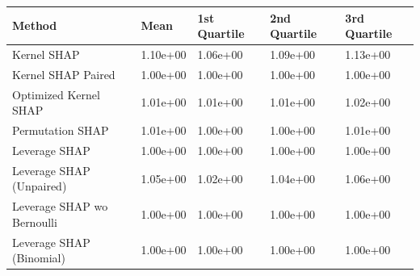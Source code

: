 \begin{tabular}{lllll}
  \toprule
  \textbf{Method} & \textbf{Mean} & \textbf{1st Quartile} & \textbf{2nd Quartile} & \textbf{3rd Quartile} \\ \midrule
Kernel SHAP & 1.10e+00 & 1.06e+00 & 1.09e+00 & 1.13e+00\\
Kernel SHAP Paired & \cellcolor{gold!60}1.00e+00 & \cellcolor{gold!60}1.00e+00 & \cellcolor{gold!60}1.00e+00 & \cellcolor{gold!60}1.00e+00\\
Optimized Kernel SHAP & 1.01e+00 & 1.01e+00 & 1.01e+00 & 1.02e+00\\
Permutation SHAP & 1.01e+00 & \cellcolor{gold!60}1.00e+00 & \cellcolor{gold!60}1.00e+00 & 1.01e+00\\
Leverage SHAP & \cellcolor{gold!60}1.00e+00 & \cellcolor{gold!60}1.00e+00 & \cellcolor{gold!60}1.00e+00 & \cellcolor{gold!60}1.00e+00\\
Leverage SHAP (Unpaired) & 1.05e+00 & 1.02e+00 & 1.04e+00 & 1.06e+00\\
Leverage SHAP wo Bernoulli & \cellcolor{gold!60}1.00e+00 & \cellcolor{gold!60}1.00e+00 & \cellcolor{gold!60}1.00e+00 & \cellcolor{gold!60}1.00e+00\\
Leverage SHAP (Binomial) & \cellcolor{gold!60}1.00e+00 & \cellcolor{gold!60}1.00e+00 & \cellcolor{gold!60}1.00e+00 & \cellcolor{gold!60}1.00e+00\\
\bottomrule
\end{tabular}

